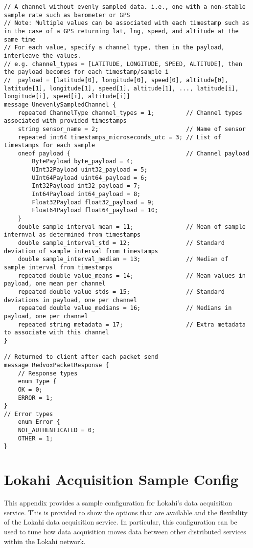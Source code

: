 \begin{lstlisting}
// A channel without evenly sampled data. i.e., one with a non-stable sample rate such as barometer or GPS
// Note: Multiple values can be associated with each timestamp such as in the case of a GPS returning lat, lng, speed, and altitude at the same time
// For each value, specify a channel type, then in the payload, interleave the values.
// e.g. channel_types = [LATITUDE, LONGITUDE, SPEED, ALTITUDE], then the payload becomes for each timestamp/sample i
//  payload = [latitude[0], longitude[0], speed[0], altitude[0], latitude[1], longitude[1], speed[1], altitude[1], ..., latitude[i], longitude[i], speed[i], altitude[i]]
message UnevenlySampledChannel {
	repeated ChannelType channel_types = 1;         // Channel types associated with provided timestamps
	string sensor_name = 2;                         // Name of sensor
	repeated int64 timestamps_microseconds_utc = 3; // List of timestamps for each sample
	oneof payload {                                 // Channel payload
		BytePayload byte_payload = 4;
		UInt32Payload uint32_payload = 5;
		UInt64Payload uint64_payload = 6;
		Int32Payload int32_payload = 7;
		Int64Payload int64_payload = 8;
		Float32Payload float32_payload = 9;
		Float64Payload float64_payload = 10;
	}
	double sample_interval_mean = 11;               // Mean of sample internval as determined from timestamps
	double sample_interval_std = 12;                // Standard deviation of sample interval from timestamps
	double sample_interval_median = 13;             // Median of sample interval from timestamps
	repeated double value_means = 14;               // Mean values in payload, one mean per channel
	repeated double value_stds = 15;                // Standard deviations in payload, one per channel
	repeated double value_medians = 16;             // Medians in payload, one per channel
	repeated string metadata = 17;                  // Extra metadata to associate with this channel
}

// Returned to client after each packet send
message RedvoxPacketResponse {
	// Response types
	enum Type {
	OK = 0;
	ERROR = 1;
}
// Error types
	enum Error {
	NOT_AUTHENTICATED = 0;
	OTHER = 1;
}

\end{lstlisting}

\chapter{Lokahi Acquisition Sample Config}
\label{lokahi_acquisition_config}

This appendix provides a sample configuration for Lokahi's data acquisition service. This is provided to show the options that are available and the flexibility of the Lokahi data acquisition service. In particular, this configuration can be used to tune how data acquisition moves data between other distributed services within the Lokahi network.

